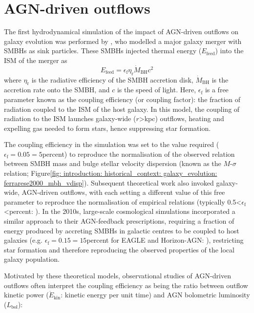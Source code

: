 \newpage
\section{AGN-driven outflows}
\label{section: introduction: outflows: introduction}

The first hydrodynamical simulation of the impact of AGN-driven outflows on galaxy evolution was performed by \citet{DiMatteo2005}, who modelled a major galaxy merger with SMBHs as sink particles. These SMBHs injected thermal energy ($E_\mathrm{feed}$) into the ISM of the merger as
\begin{equation}
    E_\mathrm{feed}=\epsilon_\mathrm{f}\eta_\mathrm{r}\dot{M}_\mathrm{BH}c^2
    \label{eq: introduction: outflows: introduction: dimatteo2005_efeed}
\end{equation}
where $\eta_\mathrm{r}$ is the radiative efficiency of the SMBH accretion disk, $\dot{M}_\mathrm{BH}$ is the accretion rate onto the SMBH, and $c$ is the speed of light. Here, $\epsilon_\mathrm{f}$ is a free parameter known as the coupling efficiency (or coupling factor): the fraction of radiation coupled to the ISM of the host galaxy. In this model, the coupling of radiation to the ISM launches galaxy-wide ($r$\;\textgreater{}\;kpc) outflows, heating and expelling gas needed to form stars, hence suppressing star formation. 

The coupling efficiency in the \citet{DiMatteo2005} simulation was set to the value required ($\epsilon_\mathrm{f}=0.05=5$\;per\;cent) to reproduce the normalisation of the observed relation between SMBH mass and bulge stellar velocity dispersion (known as the $M$-$\sigma$ relation; Figure\;\ref{fig: introduction: historical_context: galaxy_evolution: ferrarese2000_mbh_vdisp}). Subsequent theoretical work also invoked galaxy-wide, AGN-driven outflows, with each setting a different value of this free parameter to reproduce the normalisation of empirical relations (typically 0.5\;\textless\;$\epsilon_\mathrm{f}$\;\textless{}\;per\;cent: \citealt{Springel2005,Hopkins2010}). In the 2010s, large-scale cosmological simulations incorporated a similar approach to their AGN-feedback prescriptions, requiring a fraction of energy produced by accreting SMBHs in galactic centres to be coupled to host galaxies (e.g. $\epsilon_\mathrm{f}=0.15=15$\;per\;cent for EAGLE and Horizon-AGN: \citealt{Schaye2015, Dubois2016}), restricting star formation and therefore reproducing the observed properties of the local galaxy population. 

Motivated by these theoretical models, observational studies of AGN-driven outflows often interpret the coupling efficiency as being the ratio between outflow kinetic power ($\dot{E}_\mathrm{kin}$: kinetic energy per unit time) and AGN bolometric luminosity ($L_\mathrm{bol}$):

